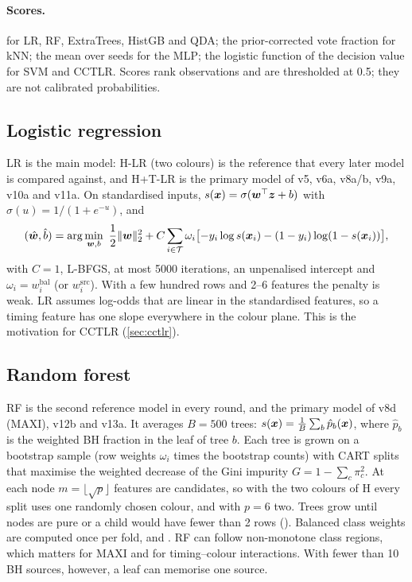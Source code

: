\paragraph{Scores.}  for LR, RF, ExtraTrees, HistGB and QDA; the prior-corrected vote fraction for
kNN; the mean over seeds for the MLP; the logistic function of the decision value for SVM and CCTLR. Scores rank observations
and are thresholded at 0.5; they are not calibrated probabilities.

\subsection{Logistic regression}\label{sec:lr}
LR is the main model: H-LR (two colours) is the reference that every later model is compared against, and H+T-LR is the
primary model of v5, v6a, v8a/b, v9a, v10a and v11a. On standardised inputs, $s(\bm{x})=\sigma(\bm{w}^\top\bm{z}+b)$
with $\sigma(u)=1/(1+e^{-u})$, and
\begin{equation}
(\hat{\bm{w}},\hat b)=\arg\min_{\bm{w},b}\ \frac12\|\bm{w}\|_2^2+C\sum_{i\in\mathcal T}\omega_i\bigl[-y_i\log s(\bm{x}_i)-(1-y_i)\log(1-s(\bm{x}_i))\bigr],\label{eq:lrobj}
\end{equation}
with $C=1$, L-BFGS, at most 5000 iterations, an unpenalised intercept and $\omega_i=w^\mathrm{bal}_i$ (or $w^\mathrm{src}_i$).
With a few hundred rows and 2--6 features the penalty is weak. LR assumes log-odds that are linear in the standardised
features, so a timing feature has one slope everywhere in the colour plane. This is the motivation for CCTLR
(\cref{sec:cctlr}).

\subsection{Random forest}\label{sec:rf}
RF is the second reference model in every round, and the primary model of v8d (MAXI), v12b and v13a. It averages $B=500$
trees: $s(\bm{x})=\frac1B\sum_b\hat p_b(\bm{x})$, where $\hat p_b$ is the weighted BH fraction in the leaf of tree $b$. Each
tree is grown on a bootstrap sample (row weights $\omega_i$ times the bootstrap counts) with CART splits that maximise the
weighted decrease of the Gini impurity $G=1-\sum_c\pi_c^2$. At each node $m=\lfloor\sqrt p\rfloor$ features are candidates,
so with the two colours of H every split uses one randomly chosen colour, and with $p=6$ two. Trees grow until nodes are
pure or a child would have fewer than 2 rows (). Balanced class weights are computed once per fold,
and . RF can follow non-monotone class regions, which matters for MAXI and for timing--colour
interactions. With fewer than 10 BH sources, however, a leaf can memorise one source.

